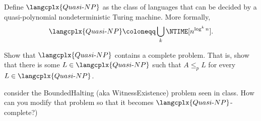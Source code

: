Define $\langcplx{Quasi\text{-}NP}$ as the class of languages that can be decided by a quasi-polynomial
nondeterministic Turing machine. More formally,
$$
    \langcplx{Quasi\text{-}NP} \coloneqq \bigcup\limits_{k} \NTIME[n^{\log^k n}].
$$

Show that $\langcplx{Quasi\text{-}NP}$ contains a complete problem. That is, show that there is some $L
\in \langcplx{Quasi\text{-}NP}$ such that $A \le_p L$ for every $L \in \langcplx{Quasi\text{-}NP}$.

 consider the BoundedHalting (aka WitnessExistence) problem seen in class. How can you
modify that problem so that it becomes $\langcplx{Quasi\text{-}NP}$-complete?)